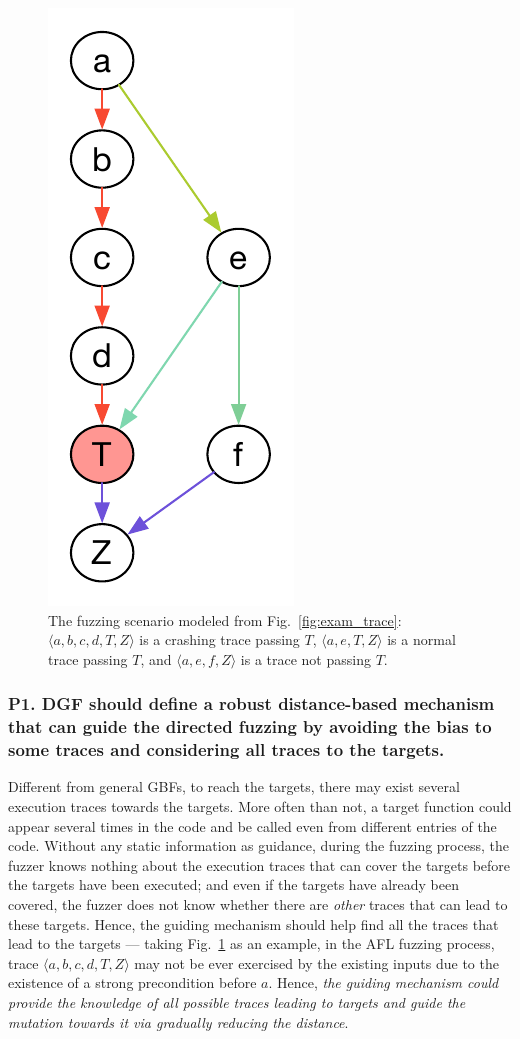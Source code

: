 \begin{figure}[t]
	\centering
	\includegraphics[width=0.16\columnwidth]{res/dfot/eg_callchain.pdf}
	\vspace{-5pt}
	\caption{The fuzzing scenario modeled from Fig.~\ref{fig:exam_trace}: $\langle a, b, c, d, T, Z\rangle $ is a crashing trace passing $T$,  $\langle a, e, T, Z\rangle$ is a normal trace passing $T$, and $\langle a, e, f , Z\rangle$ is a trace not passing $T$.}
	\label{fig:call_chain}
\end{figure}

\subsubsection{\textbf{P1}. DGF should define a \textbf{robust} distance-based mechanism that can guide the directed fuzzing by avoiding the bias to some traces and considering all traces to the targets.}  \label{subsec:p1}
Different from general GBFs, to reach the targets, there may exist several execution traces towards the targets. More often than not, a target function could appear several times in the code and be called even from different entries of the code. Without any static information as guidance, during the fuzzing process, the fuzzer knows nothing about the execution traces that can cover the targets before the targets have been executed; and even if the targets have already been covered, the fuzzer does not know whether there are \emph{other} traces that can lead to these targets.  Hence, the guiding mechanism should help find all the traces that lead to the targets --- taking Fig.~\ref{fig:call_chain} as an example, in the AFL fuzzing process, trace $\langle a, b, c, d, T, Z\rangle$  may not be ever exercised by the existing inputs due to the existence of a strong precondition before $a$. Hence, \emph{the guiding mechanism could provide the knowledge of all possible traces leading to targets and guide the mutation towards it via gradually reducing the distance}. 

